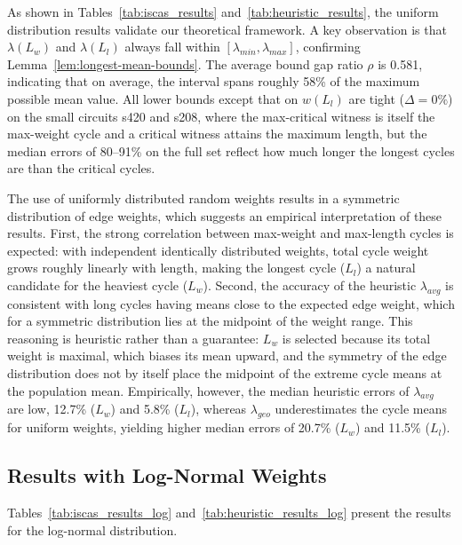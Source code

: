 \documentclass{article}
\theoremstyle{definition}
\begin{document}
As shown in Tables~\ref{tab:iscas_results}
and~\ref{tab:heuristic_results}, the uniform distribution results
validate our theoretical framework. A key observation is that
$\lambda(L_w)$ and $\lambda(L_l)$ always fall within
$[\lambda_{min}, \lambda_{max}]$, confirming
Lemma~\ref{lem:longest-mean-bounds}. The average bound gap ratio
$\rho$ is 0.581, indicating that on average, the interval spans
roughly 58\% of the maximum possible mean value. All lower bounds
except that on $w(L_l)$ are tight ($\Delta = 0\%$) on the small
circuits s420 and s208, where the max-critical witness is itself the
max-weight cycle and a critical witness attains the maximum length,
but the median errors of 80--91\% on the full set reflect how much
longer the longest cycles are than the critical cycles.

The use of uniformly distributed random weights results in a symmetric
distribution of edge weights, which suggests an empirical
interpretation of these results. First, the strong correlation between
max-weight and max-length cycles is expected: with independent
identically distributed weights, total cycle weight grows roughly
linearly with length, making the longest cycle ($L_l$) a natural
candidate for the heaviest cycle ($L_w$). Second, the accuracy of the
heuristic $\lambda_{avg}$ is consistent with long cycles having means
close to the expected edge weight, which for a symmetric distribution
lies at the midpoint of the weight range. This reasoning is heuristic
rather than a guarantee: $L_w$ is selected because its total weight is
maximal, which biases its mean upward, and the symmetry of the edge
distribution does not by itself place the midpoint of the extreme
cycle means at the population mean. Empirically, however, the median
heuristic errors of $\lambda_{avg}$ are low, 12.7\% ($L_w$) and 5.8\%
($L_l$), whereas $\lambda_{geo}$ underestimates the cycle means for
uniform weights, yielding higher median errors of 20.7\% ($L_w$) and
11.5\% ($L_l$).

\subsection{Results with Log-Normal Weights}

Tables~\ref{tab:iscas_results_log} and~\ref{tab:heuristic_results_log}
present the results for the log-normal distribution.
\end{document}
